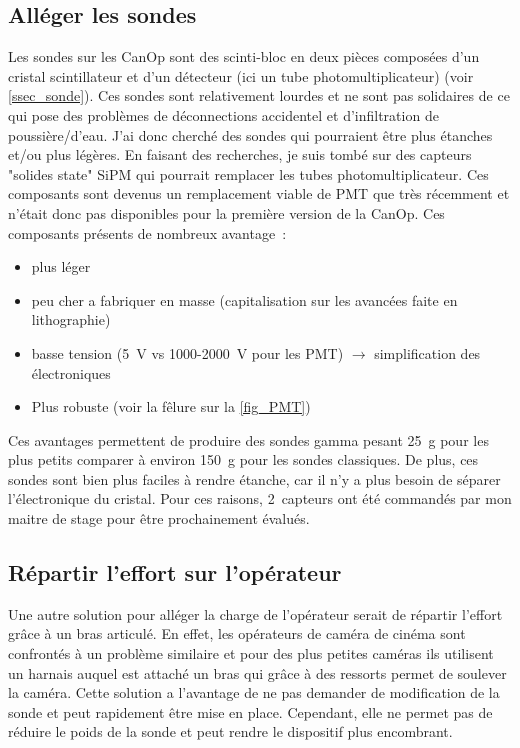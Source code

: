 \subsection{Alléger les sondes}
Les sondes sur les CanOp sont des scinti-bloc en deux pièces composées d'un cristal scintillateur et d'un détecteur (ici un tube photomultiplicateur) (voir \cref{ssec_sonde}). Ces sondes sont relativement lourdes et ne sont pas solidaires de ce qui pose des problèmes de déconnections accidentel et d'infiltration de poussière/d'eau. %
J'ai donc cherché des sondes qui pourraient être plus étanches et/ou plus légères. En faisant des recherches, je suis tombé sur des capteurs "solides state" SiPM qui pourrait remplacer les tubes photomultiplicateur. Ces composants sont devenus un remplacement viable de PMT que très récemment et n'était donc pas disponibles pour la première version de la CanOp. Ces composants présents de nombreux avantage~:
\begin{itemize}
    \item plus léger
    \item peu cher a fabriquer en masse (capitalisation sur les avancées faite en lithographie)
    \item basse tension (5~V vs 1000-2000~V pour les PMT) $\rightarrow$ simplification des électroniques
    \item Plus robuste (voir la fêlure sur la \cref{fig_PMT})
\end{itemize}

Ces avantages permettent de produire des sondes gamma pesant 25~g pour les plus petits comparer à environ 150~g pour les sondes classiques. De plus, ces sondes sont bien plus faciles à rendre étanche, car il n'y a plus besoin de séparer l'électronique du cristal. Pour ces raisons, 2~capteurs ont été commandés par mon maitre de stage pour être prochainement évalués.

\subsection{Répartir l'effort sur l'opérateur}
Une autre solution pour alléger la charge de l'opérateur serait de répartir l'effort grâce à un bras articulé. En effet, les opérateurs de caméra de cinéma sont confrontés à un problème similaire et pour des plus petites caméras ils utilisent un harnais auquel est attaché un bras qui grâce à des ressorts permet de soulever la caméra. Cette solution a l'avantage de ne pas demander de modification de la sonde et peut rapidement être mise en place. Cependant, elle ne permet pas de réduire le poids de la sonde et peut rendre le dispositif plus encombrant.